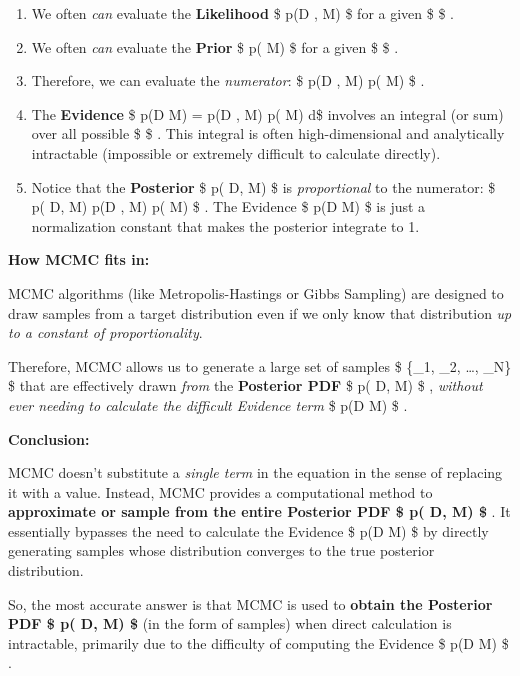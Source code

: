 \documentclass[11pt]{article}
\providecommand{\tightlist}{%
      \setlength{\itemsep}{0pt}\setlength{\parskip}{0pt}}
\begin{document}
\begin{enumerate}
\def\labelenumi{\arabic{enumi}.}
\tightlist
\item
  We often \emph{can} evaluate the \textbf{Likelihood} \$ p(D \textbar{}
  \theta, M) \$ for a given \$ \theta \$ .
\item
  We often \emph{can} evaluate the \textbf{Prior} \$ p(\theta \textbar{}
  M) \$ for a given \$ \theta \$ .
\item
  Therefore, we can evaluate the \emph{numerator}: \$ p(D \textbar{}
  \theta, M) p(\theta \textbar{} M) \$ .
\item
  The \textbf{Evidence} \$ p(D \textbar{} M) = \int p(D \textbar{}
  \theta, M) p(\theta \textbar{} M) d\theta \$ involves an integral (or
  sum) over all possible \$ \theta \$ . This integral is often
  high-dimensional and analytically intractable (impossible or extremely
  difficult to calculate directly).
\item
  Notice that the \textbf{Posterior} \$ p(\theta \textbar{} D, M) \$ is
  \emph{proportional} to the numerator: \$ p(\theta \textbar{} D, M)
  \propto p(D \textbar{} \theta, M) p(\theta \textbar{} M) \$ . The
  Evidence \$ p(D \textbar{} M) \$ is just a normalization constant that
  makes the posterior integrate to 1.
\end{enumerate}

\textbf{How MCMC fits in:}

MCMC algorithms (like Metropolis-Hastings or Gibbs Sampling) are
designed to draw samples from a target distribution even if we only know
that distribution \emph{up to a constant of proportionality}.

Therefore, MCMC allows us to generate a large set of samples \$
\{\theta\_1, \theta\_2, \ldots, \theta\_N\} \$ that are effectively
drawn \emph{from} the \textbf{Posterior PDF} \$ p(\theta \textbar{} D,
M) \$ , \emph{without ever needing to calculate the difficult Evidence
term} \$ p(D \textbar{} M) \$ .

\textbf{Conclusion:}

MCMC doesn't substitute a \emph{single term} in the equation in the
sense of replacing it with a value. Instead, MCMC provides a
computational method to \textbf{approximate or sample from the entire
Posterior PDF \$ p(\theta \textbar{} D, M) \$ }. It essentially bypasses
the need to calculate the Evidence \$ p(D \textbar{} M) \$ by directly
generating samples whose distribution converges to the true posterior
distribution.

So, the most accurate answer is that MCMC is used to \textbf{obtain the
Posterior PDF \$ p(\theta \textbar{} D, M) \$ } (in the form of samples)
when direct calculation is intractable, primarily due to the difficulty
of computing the Evidence \$ p(D \textbar{} M) \$ .
\end{document}
